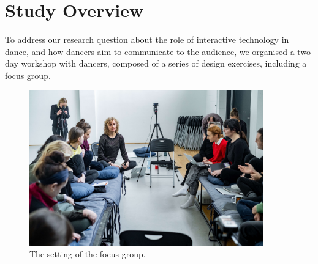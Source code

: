 \section{Study Overview}

To address our research question about the role of interactive technology in dance, and how dancers aim to communicate to the audience, we organised a two-day workshop with dancers, composed of a series of design exercises, including a focus group.


\begin{figure}
\centering
\includegraphics[width=0.9\textwidth]{Chapters/Figures/preliminary_actions/STL_focus_group_optimized.jpg}
\caption{The setting of the focus group.} \label{fig1}
\end{figure}

